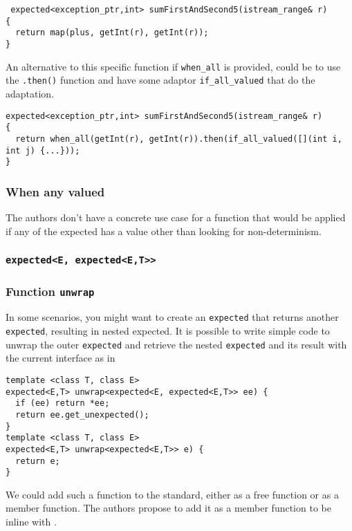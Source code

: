 \documentclass[a4paper,10pt]{article}
\newcommand{\cpp}[1]{\lstinline{#1}}
\begin{document}
\begin{lstlisting}
 expected<exception_ptr,int> sumFirstAndSecond5(istream_range& r)
{
  return map(plus, getInt(r), getInt(r));
}
\end{lstlisting}

An alternative to this specific function if \cpp{when_all} is provided, could be to use the \cpp{.then()} function and have some adaptor \cpp{if_all_valued} that do the adaptation.

\begin{lstlisting}
expected<exception_ptr,int> sumFirstAndSecond5(istream_range& r)
{
  return when_all(getInt(r), getInt(r)).then(if_all_valued([](int i, int j) {...}));
}
\end{lstlisting}

\subsubsection{When any valued}

The authors don't have a concrete use case for a function that would be applied if any of the expected has a value other than looking for non-determinism.

\subsubsection{\cpp{expected<E, expected<E,T>>}}


\subsubsection{Function \cpp{unwrap}}

In some scenarios, you might want to create an \cpp{expected} that returns another \cpp{expected}, resulting in nested expected. 
It is possible to write simple code to unwrap the outer \cpp{expected} and retrieve the nested \cpp{expected} and its result with the current interface as in

\begin{lstlisting}
template <class T, class E>
expected<E,T> unwrap<expected<E, expected<E,T>> ee) {
  if (ee) return *ee;
  return ee.get_unexpected();
}
template <class T, class E>
expected<E,T> unwrap<expected<E,T>> e) {
  return e;
}
\end{lstlisting}

We could add such a function to the standard, either as a free function or as a member function. The authors propose to add it as a member function to be inline with \cite{ImprovementsAsync}.
\end{document}
